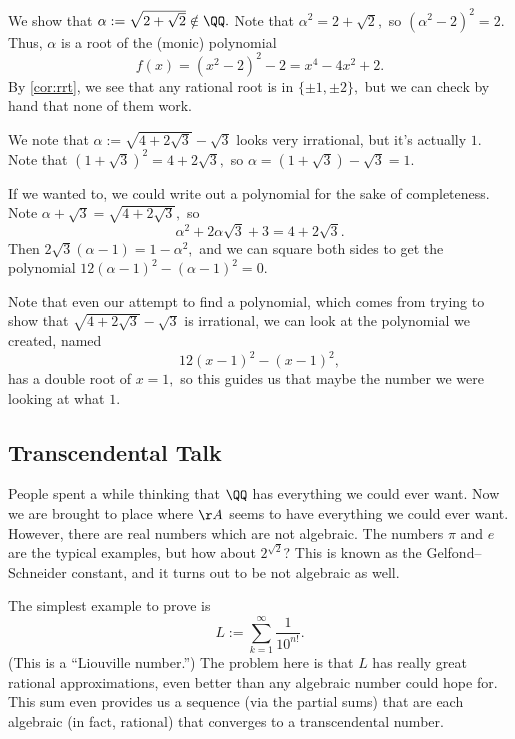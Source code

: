 \documentclass[../notes.tex]{subfiles}
\begin{document}
\begin{ex}
	We show that $\alpha:=\sqrt{2+\sqrt2}\notin\QQ.$ Note that $\alpha^2=2+\sqrt2,$ so $\left(\alpha^2-2\right)^2=2.$ Thus, $\alpha$ is a root of the (monic) polynomial
	\[f(x)=\left(x^2-2\right)^2-2=x^4-4x^2+2.\]
	By \autoref{cor:rrt}, we see that any rational root is in $\{\pm1,\pm2\},$ but we can check by hand that none of them work.
\end{ex}
\begin{ex}
	We note that $\alpha:=\sqrt{4+2\sqrt3}-\sqrt3$ looks very irrational, but it's actually $1.$ Note that $\left(1+\sqrt3\right)^2=4+2\sqrt3,$ so $\alpha=(1+\sqrt3)-\sqrt3=1.$
	
	If we wanted to, we could write out a polynomial for the sake of completeness. Note $\alpha+\sqrt3=\sqrt{4+2\sqrt3},$ so
	\[\alpha^2+2\alpha\sqrt3+3=4+2\sqrt3.\]
	Then $2\sqrt3(\alpha-1)=1-\alpha^2,$ and we can square both sides to get the polynomial $12(\alpha-1)^2-\left(\alpha-1\right)^2=0.$
\end{ex}
Note that even our attempt to find a polynomial, which comes from trying to show that $\sqrt{4+2\sqrt3}-\sqrt3$ is irrational, we can look at the polynomial we created, named
\[12(x-1)^2-\left(x-1\right)^2,\]
has a double root of $x=1,$ so this guides us that maybe the number we were looking at what $1.$

\subsection{Transcendental Talk}
People spent a while thinking that $\QQ$ has everything we could ever want. Now we are brought to place where $\AA$ seems to have everything we could ever want. However, there are real numbers which are not algebraic. The numbers $\pi$ and $e$ are the typical examples, but how about $2^{\sqrt2}$? This is known as the Gelfond--Schneider constant, and it turns out to be not algebraic as well.

The simplest example to prove is
\[L:=\sum_{k=1}^\infty\frac1{10^{n!}}.\]
(This is a ``Liouville number.'') The problem here is that $L$ has really great rational approximations, even better than any algebraic number could hope for. This sum even provides us a sequence (via the partial sums) that are each algebraic (in fact, rational) that converges to a transcendental number.
\end{document}
